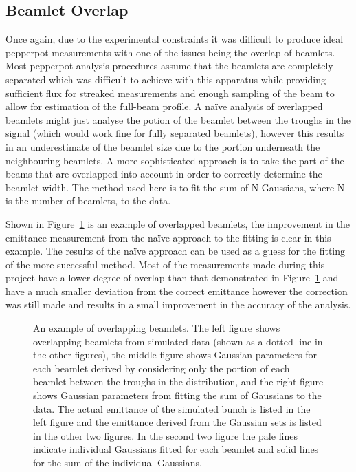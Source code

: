 \subsection{Beamlet Overlap}
Once again, due to the experimental constraints it was difficult to produce ideal pepperpot measurements with one of the issues being the overlap of beamlets.
Most pepperpot analysis procedures assume that the beamlets are completely separated which was difficult to achieve with this apparatus while providing sufficient flux for streaked measurements and enough sampling of the beam to allow for estimation of the full-beam profile.
A na\"ive analysis of overlapped beamlets might just analyse the potion of the beamlet between the troughs in the signal (which would work fine for fully separated beamlets), however this results in an underestimate of the beamlet size due to the portion underneath the neighbouring beamlets.
A more sophisticated approach is to take the part of the beams that are overlapped into account in order to correctly determine the beamlet width.
The method used here is to fit the sum of N Gaussians, where N is the number of beamlets, to the data.

Shown in Figure~\ref{figure:overlap_example} is an example of overlapped beamlets, the improvement in the emittance measurement from the na\"ive approach to the fitting is clear in this example.
The results of the na\"ive approach can be used as a guess for the fitting of the more successful method.
Most of the measurements made during this project have a lower degree of overlap than that demonstrated in Figure~\ref{figure:overlap_example} and have a much smaller deviation from the correct emittance however the correction was still made and results in a small improvement in the accuracy of the analysis.

\begin{figure}
    \center
    
    \caption[An example of overlapping beamlets.]{An example of overlapping beamlets.
    The left figure shows overlapping beamlets from simulated data (shown as a dotted line in the other figures), the middle figure shows Gaussian parameters for each beamlet derived by considering only the portion of each beamlet between the troughs in the distribution, and the right figure shows Gaussian parameters from fitting the sum of Gaussians to the data.
    The actual emittance of the simulated bunch is listed in the left figure and the emittance derived from the Gaussian sets is listed in the other two figures.
    In the second two figure the pale lines indicate individual Gaussians fitted for each beamlet and solid lines for the sum of the individual Gaussians.}
    \label{figure:overlap_example}
\end{figure}


